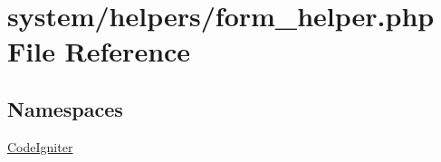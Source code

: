 \hypertarget{form__helper_8php}{\section{system/helpers/form\-\_\-helper.php File Reference}
\label{form__helper_8php}
}
\subsection*{Namespaces}
\begin{DoxyCompactItemize}
\item 
\hyperlink{namespace_code_igniter}{Code\-Igniter}
\end{DoxyCompactItemize}
